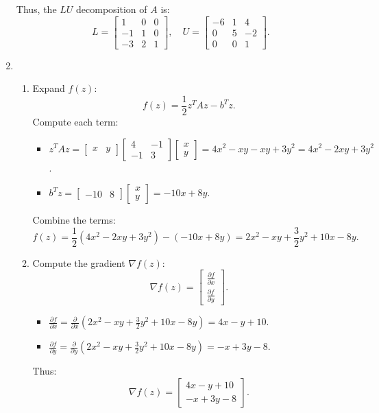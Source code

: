 \documentclass[12pt]{article}
\begin{document}
\begin{enumerate}
Thus, the \( LU \) decomposition of \( A \) is:
\[
L =
\begin{bmatrix}
1 & 0 & 0 \\
-1 & 1 & 0 \\
-3 & 2 & 1
\end{bmatrix},
\quad
U =
\begin{bmatrix}
-6 & 1 & 4 \\
0 & 5 & -2 \\
0 & 0 & 1
\end{bmatrix}.
\]
\item 
\begin{enumerate}
    \item Expand \( f(z) \):
    \[
    f(z) = \frac{1}{2} z^T A z - b^T z.
    \]
    Compute each term:
    \begin{itemize}
        \item \( z^T A z = \begin{bmatrix} x & y \end{bmatrix} \begin{bmatrix} 4 & -1 \\ -1 & 3 \end{bmatrix} \begin{bmatrix} x \\ y \end{bmatrix} = 4x^2 - xy - xy + 3y^2 = 4x^2 - 2xy + 3y^2 \).
        \item \( b^T z = \begin{bmatrix} -10 & 8 \end{bmatrix} \begin{bmatrix} x \\ y \end{bmatrix} = -10x + 8y \).
    \end{itemize}
    Combine the terms:
    \[
    f(z) = \frac{1}{2}(4x^2 - 2xy + 3y^2) - (-10x + 8y) = 2x^2 - xy + \frac{3}{2}y^2 + 10x - 8y.
    \]

    \item Compute the gradient \( \nabla f(z) \):
    \[
    \nabla f(z) = \begin{bmatrix} \frac{\partial f}{\partial x} \\ \frac{\partial f}{\partial y} \end{bmatrix}.
    \]
    \begin{itemize}
        \item \( \frac{\partial f}{\partial x} = \frac{\partial}{\partial x} \left( 2x^2 - xy + \frac{3}{2}y^2 + 10x - 8y \right) = 4x - y + 10 \).
        \item \( \frac{\partial f}{\partial y} = \frac{\partial}{\partial y} \left( 2x^2 - xy + \frac{3}{2}y^2 + 10x - 8y \right) = -x + 3y - 8 \).
    \end{itemize}
    Thus:
    \[
    \nabla f(z) = \begin{bmatrix} 4x - y + 10 \\ -x + 3y - 8 \end{bmatrix}.
    \]


\end{enumerate}
\end{enumerate}
\end{document}
